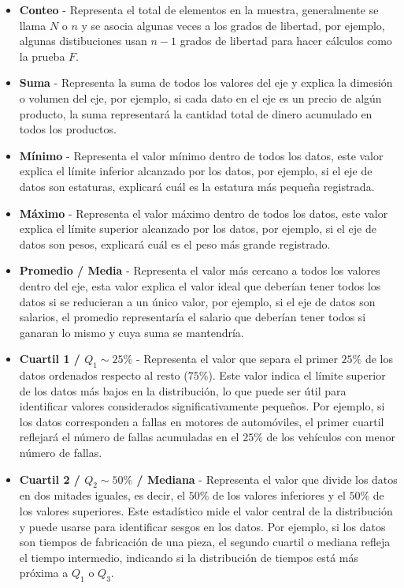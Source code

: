 \documentclass{article}
\begin{document}
\begin{itemize}
    \item \textbf{Conteo} - Representa el total de elementos en la muestra, generalmente se llama $N$ o $n$ y se asocia algunas veces a los grados de libertad, por ejemplo, algunas distibuciones usan $n-1$ grados de libertad para hacer cálculos como la prueba $F$.
    \item \textbf{Suma} - Representa la suma de todos los valores del eje y explica la dimesión o volumen del eje, por ejemplo, si cada dato en el eje es un precio de algún producto, la suma representará la cantidad total de dinero acumulado en todos los productos.
    \item \textbf{Mínimo} - Representa el valor mínimo dentro de todos los datos, este valor explica el límite inferior alcanzado por los datos, por ejemplo, si el eje de datos son estaturas, explicará cuál es la estatura más pequeña registrada.
    \item \textbf{Máximo} - Representa el valor máximo dentro de todos los datos, este valor explica el límite superior alcanzado por los datos, por ejemplo, si el eje de datos son pesos, explicará cuál es el peso más grande registrado.
    \item \textbf{Promedio / Media} - Representa el valor más cercano a todos los valores dentro del eje, esta valor explica el valor ideal que deberían tener todos los datos si se reducieran a un único valor, por ejemplo, si el eje de datos son salarios, el promedio representaría el salario que deberían tener todos si ganaran lo mismo y cuya suma se mantendría.
    \item \textbf{Cuartil 1 / $Q_1 \sim 25\%$} - Representa el valor que separa el primer $25\%$ de los datos ordenados respecto al resto ($75\%$). Este valor indica el límite superior de los datos más bajos en la distribución, lo que puede ser útil para identificar valores considerados significativamente pequeños. Por ejemplo, si los datos corresponden a fallas en motores de automóviles, el primer cuartil reflejará el número de fallas acumuladas en el $25\%$ de los vehículos con menor número de fallas.
    \item \textbf{Cuartil 2 / $Q_2 \sim 50\%$ / Mediana} - Representa el valor que divide los datos en dos mitades iguales, es decir, el $50\%$ de los valores inferiores y el $50\%$ de los valores superiores. Este estadístico mide el valor central de la distribución y puede usarse para identificar sesgos en los datos. Por ejemplo, si los datos son tiempos de fabricación de una pieza, el segundo cuartil o mediana refleja el tiempo intermedio, indicando si la distribución de tiempos está más próxima a $Q_1$ o $Q_3$.

\end{itemize}
\end{document}
